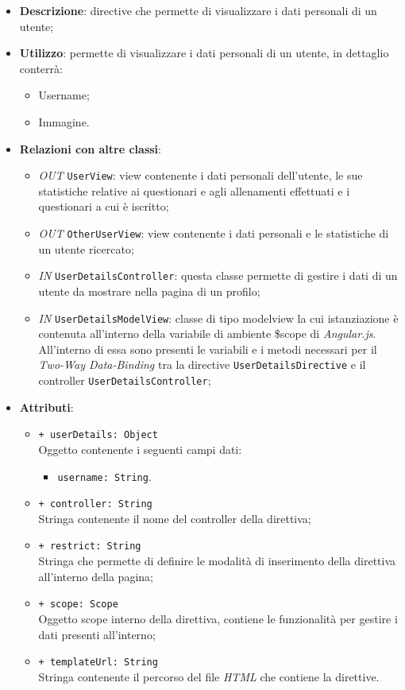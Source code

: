 \begin{itemize}
	\item \textbf{Descrizione}: directive che permette di visualizzare i dati personali di un utente;
	\item \textbf{Utilizzo}: permette di visualizzare i dati personali di un utente, in dettaglio conterrà:
	\begin{itemize}
		\item Username;
		\item Immagine.
	\end{itemize}
	\item \textbf{Relazioni con altre classi}:
	\begin{itemize}
		\item \textit{OUT} \texttt{UserView}: view contenente i dati personali dell'utente, le sue statistiche relative ai questionari e agli allenamenti effettuati e i questionari a cui è iscritto;
		\item \textit{OUT} \texttt{OtherUserView}: view contenente i dati personali e le statistiche di un utente ricercato;
		\item \textit{IN} \texttt{UserDetailsController}: questa classe permette di gestire i dati di un utente da mostrare nella pagina di un profilo;
		\item \textit{IN} \texttt{UserDetailsModelView}: classe di tipo modelview la cui istanziazione è contenuta all'interno della variabile di ambiente \$scope di \textit{Angular.js}. All'interno di essa sono presenti le variabili e i metodi necessari per il \textit{Two-Way Data-Binding} tra la directive \texttt{UserDetailsDirective} e il controller \texttt{UserDetailsController};
	\end{itemize}
	\item \textbf{Attributi}:
	\begin{itemize}
		\item \texttt{+ userDetails: Object} \\ Oggetto contenente i seguenti campi dati:
		\begin{itemize}
			\item \texttt{username: String}.
		\end{itemize}
		\item \texttt{+ controller: String} \\ Stringa contenente il nome del controller della direttiva;
		\item \texttt{+ restrict: String} \\ Stringa che permette di definire le modalità di inserimento della direttiva all'interno della pagina;
		\item \texttt{+ scope: Scope} \\ Oggetto scope interno della direttiva, contiene le funzionalità per gestire i dati presenti all'interno;
		\item \texttt{+ templateUrl: String} \\ Stringa contenente il percorso del file \textit{HTML} che contiene la direttive.
	\end{itemize}
\end{itemize}
